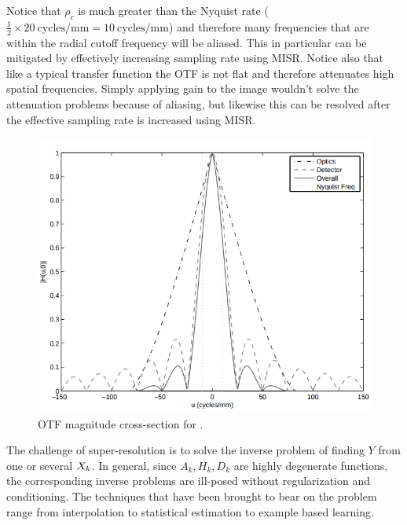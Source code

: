%
Notice that \(\rho_c\) is much greater than the Nyquist rate (\(\frac{1}{2} \times 20~\text{cycles}/\text{mm} = 10~\text{cycles}/\text{mm}\)) and therefore many frequencies that are within the radial cutoff frequency will be aliased.
%
This in particular can be mitigated by effectively increasing sampling rate using MISR.
%
Notice also that like a typical transfer function the OTF is not flat and therefore attenuates high spatial frequencies.
%
Simply applying gain to the image wouldn't solve the attenuation problems because of aliasing, but likewise this can be resolved after the effective sampling rate is increased using MISR.
\begin{figure}[!htbp]
	\includegraphics[width=\linewidth,keepaspectratio]{figures/background/mtf.png}
	\caption{OTF magnitude cross-section for \cite{milanfar2017super}.}
	\label{fig:mtf}
\end{figure}

The challenge of super-resolution is to solve the inverse problem of finding \(Y\) from one or several \(X_k\).
%
In general, since \(A_k, H_k, D_k\) are highly degenerate functions, the corresponding inverse problems are ill-posed without regularization and conditioning.
%
The techniques that have been brought to bear on the problem range from interpolation to statistical estimation to example based learning.
